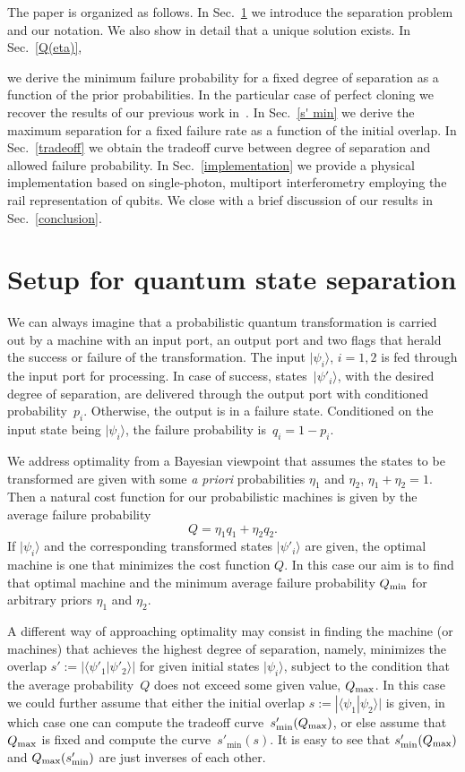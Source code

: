 \documentclass[aps,pra,twocolumn,showpacs]{revtex4-1}
\begin{document}
The paper is organized as follows. In Sec.~\ref{setup} we introduce the separation problem and our notation. We also show in detail that a unique solution exists. 
In Sec.~\ref{Q(eta)}, {we derive the minimum failure probability for a fixed degree of separation as a function of the prior probabilities. In the  particular case  of perfect cloning we recover the results of our previous work in~\cite{us1}. In Sec.~\ref{s' min} we derive the maximum separation for a fixed failure rate as a function of the initial overlap. In Sec.~\ref{tradeoff} we obtain the tradeoff curve between degree of separation and allowed failure probability. In Sec.~\ref{implementation} we provide a physical implementation based on single-photon, multiport interferometry employing the rail representation of qubits. We close with a brief discussion of our results in Sec.~\ref{conclusion}.

\section{Setup for quantum state separation}\label{setup}

We can always imagine that a probabilistic quantum transformation is carried out by a machine with an input port, an output port and two flags that herald the success or failure of the transformation.  The input $|\psi_i\rangle$, $i=1,2$ is fed through the input port for processing. In case of success, states~$|\psi'_i\rangle$, with the desired degree of separation, are delivered through the output port with conditioned probability~$p_i$. Otherwise, the output is in a failure state. Conditioned on the input state being $|\psi_i\rangle$, the failure probability is~$q_i=1-p_i$. 

We address optimality from a Bayesian viewpoint that assumes the states to be transformed are given with some {\it a priori}  probabilities $\eta_1$ and $\eta_2$, $\eta_1+\eta_2=1$. Then a natural cost function for our probabilistic machines is given by the average failure probability 
%
\begin{equation}
Q=\eta_1 q_1+\eta_2 q_2.
\label{obj fun}
\end{equation}
%
If $|\psi_i\rangle$ and the corresponding transformed states $|\psi'_i\rangle$ are given, the optimal machine is one that minimizes the cost function 
$Q$. In this case our aim is to find that optimal machine and the minimum average failure probability $Q_{\rm min}$ for arbitrary priors $\eta_1$ and $\eta_2$.


A different way of approaching optimality may consist in finding the machine (or machines) that achieves the highest degree of separation, namely, minimizes the overlap $s':=|\langle\psi'_1|\psi'_2\rangle|$ for given initial states $|\psi_i\rangle$, subject to the condition that the average probability~$Q$ does not exceed some given value, $Q_{\rm max}$. In this case we could further assume that either the initial overlap $s:=|\langle\psi_1|\psi_2\rangle|$ is given, in which case one can compute the tradeoff curve~$s'_{\rm min}(Q_{\rm max})$, or else assume that $Q_{\rm max}$ is fixed and compute the curve~$s'_{\min}(s)$. It is easy to see that $s'_{\rm min}(Q_{\rm max})$ and $Q_{\rm max}(s'_{\rm min})$ are just inverses of each other.

}
\end{document}
